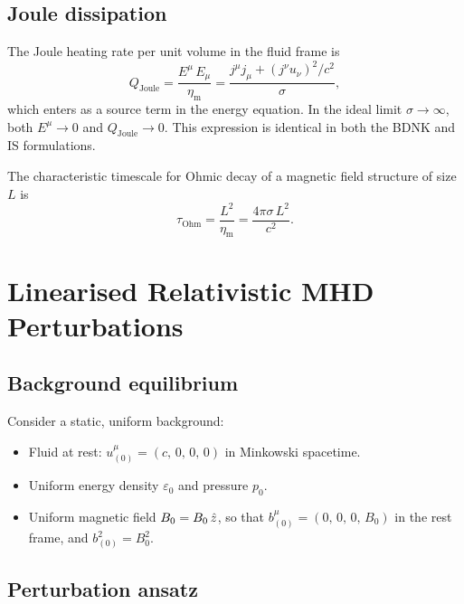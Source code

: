 \subsection{Joule dissipation}

The Joule heating rate per unit volume in the fluid frame is
\begin{equation}
  Q_{\mathrm{Joule}}
  = \frac{E^{\mu}\,E_{\mu}}{\eta_{\mathrm{m}}}
  = \frac{j^{\mu}j_{\mu} + (j^{\nu}u_{\nu})^{2}/c^{2}}{\sigma},
  \label{eq:Joule}
\end{equation}
which enters as a source term in the energy equation.  In the ideal limit
$\sigma\to\infty$, both $E^{\mu}\to 0$ and $Q_{\mathrm{Joule}}\to 0$.
This expression is identical in both the BDNK and IS formulations.

The characteristic timescale for Ohmic decay of a magnetic field
structure of size $L$ is
\begin{equation}
  \tau_{\mathrm{Ohm}} = \frac{L^{2}}{\eta_{\mathrm{m}}}
  = \frac{4\pi\sigma\,L^{2}}{c^{2}}.
  \label{eq:tau-Ohm}
\end{equation}


\section{Linearised Relativistic MHD Perturbations}
\label{sec:linearised-rmhd}

\subsection{Background equilibrium}

Consider a static, uniform background:
\begin{itemize}
  \item Fluid at rest: $u^{\mu}_{(0)} = (c,\,0,\,0,\,0)$ in Minkowski
        spacetime.
  \item Uniform energy density $\varepsilon_{0}$ and pressure $p_{0}$.
  \item Uniform magnetic field $B_{0} = B_{0}\,\hat{z}$,
        so that $b^{\mu}_{(0)} = (0,\,0,\,0,\,B_{0})$ in the rest frame,
        and $b^{2}_{(0)} = B_{0}^{2}$.
\end{itemize}

\subsection{Perturbation ansatz}

